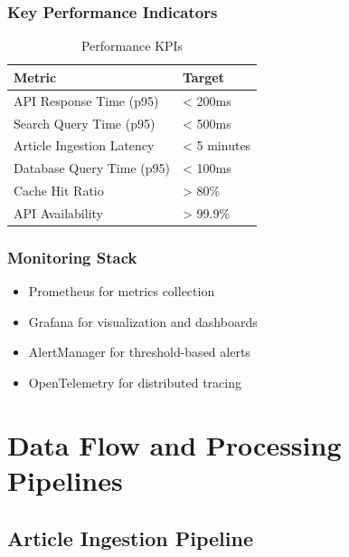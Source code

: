 \documentclass[12pt,a4paper]{report}
\begin{document}
\subsection{Key Performance Indicators}

\begin{table}[H]
\centering
\small
\begin{tabular}{|l|l|}
\hline
\textbf{Metric} & \textbf{Target} \\
\hline
API Response Time (p95) & < 200ms \\
Search Query Time (p95) & < 500ms \\
Article Ingestion Latency & < 5 minutes \\
Database Query Time (p95) & < 100ms \\
Cache Hit Ratio & > 80\% \\
API Availability & > 99.9\% \\
\hline
\end{tabular}
\caption{Performance KPIs}
\end{table}

\subsection{Monitoring Stack}

\begin{itemize}[label=\textbullet]
    \item Prometheus for metrics collection
    \item Grafana for visualization and dashboards
    \item AlertManager for threshold-based alerts
    \item OpenTelemetry for distributed tracing
\end{itemize}

\newpage


\chapter{Data Flow and Processing Pipelines}

\section{Article Ingestion Pipeline}
\end{document}
